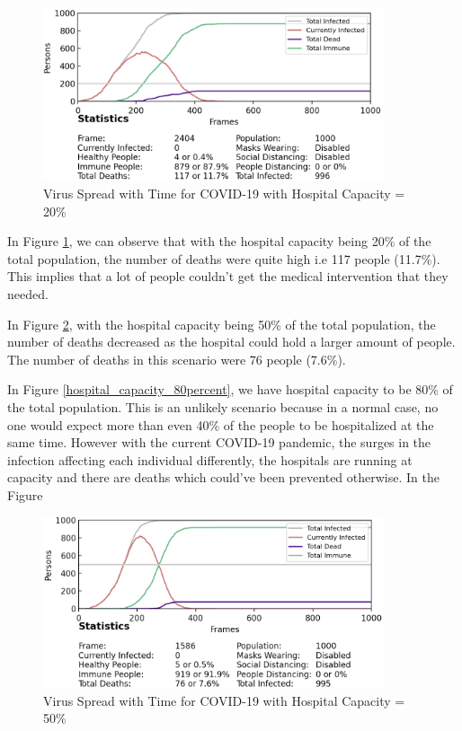 \documentclass[11pt]{article}
\begin{document}
 \begin{figure}[H]
    \centering
    \includegraphics[width=10cm]{figures/hospital_capacity_20percent.png}
    \caption{Virus Spread with Time for COVID-19 with Hospital Capacity = 20\%}
    \label{hospital_capacity_20percent}
\end{figure}

In Figure \ref{hospital_capacity_20percent}, we can observe that with the hospital capacity being 20\% of the total population, the number of deaths were quite high i.e 117 people (11.7\%). This implies that a lot of people couldn't get the medical intervention that they needed. 

In Figure \ref{hospital_capacity_50percent}, with the hospital capacity being 50\% of the total population, the number of deaths decreased as the hospital could hold a larger amount of people. The number of deaths in this scenario were 76 people (7.6\%). 

In Figure \ref{hospital_capacity_80percent}, we have hospital capacity to be 80\% of the total population. This is an unlikely scenario because in a normal case, no one would expect more than even 40\% of the people to be hospitalized at the same time. However with the current COVID-19 pandemic, the surges in the infection affecting each individual differently, the hospitals are running at capacity and there are deaths which could've been prevented otherwise. In the Figure

\begin{figure}[H]
    \centering
    \includegraphics[width=10cm]{figures/hospital_capacity_50percent.png}
    \caption{Virus Spread with Time for COVID-19 with Hospital Capacity = 50\%}
    \label{hospital_capacity_50percent}
\end{figure}
\end{document}
